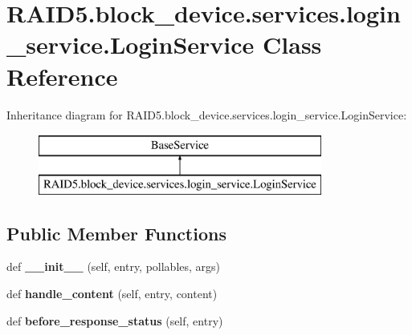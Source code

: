 \hypertarget{class_r_a_i_d5_1_1block__device_1_1services_1_1login__service_1_1_login_service}{}\section{R\+A\+I\+D5.\+block\+\_\+device.\+services.\+login\+\_\+service.\+Login\+Service Class Reference}
\label{class_r_a_i_d5_1_1block__device_1_1services_1_1login__service_1_1_login_service}
Inheritance diagram for R\+A\+I\+D5.\+block\+\_\+device.\+services.\+login\+\_\+service.\+Login\+Service\+:\begin{figure}[H]
\begin{center}
\leavevmode
\includegraphics[height=2.000000cm]{class_r_a_i_d5_1_1block__device_1_1services_1_1login__service_1_1_login_service}
\end{center}
\end{figure}
\subsection*{Public Member Functions}
\begin{DoxyCompactItemize}
\item 
\mbox{\label{class_r_a_i_d5_1_1block__device_1_1services_1_1login__service_1_1_login_service_a3e9d974a2333ef0cb54874b65842ca53}} 
def {\bfseries \+\_\+\+\_\+init\+\_\+\+\_\+} (self, entry, pollables, args)
\item 
\mbox{\label{class_r_a_i_d5_1_1block__device_1_1services_1_1login__service_1_1_login_service_a0dbcb210b5b1bbd67a0321b86c21824f}} 
def {\bfseries handle\+\_\+content} (self, entry, content)
\item 
\mbox{\label{class_r_a_i_d5_1_1block__device_1_1services_1_1login__service_1_1_login_service_ad6279990022af1400907394ad4fb2fb4}} 
def {\bfseries before\+\_\+response\+\_\+status} (self, entry)
\end{DoxyCompactItemize}

